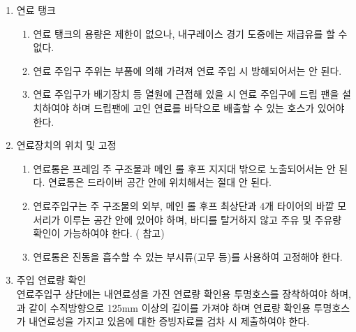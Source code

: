 \documentclass[final,a4paper,10pt]{report}
\begin{document}
\begin{enumerate}
  \item\label{rule:formula-technical.fuel-system.fuel-tank} 연료 탱크
    \begin{enumerate}
      \item\label{rule:formula-technical.fuel-system.fuel-tank.no-refuel-during-endurance} 연료 탱크의 용량은 제한이 없으나, 내구레이스 경기 도중에는 재급유를 할 수 없다.
      \item\label{rule:formula-technical.fuel-system.fuel-tank.unobstructed-filler-neck} 연료 주입구 주위는 부품에 의해 가려져 연료 주입 시 방해되어서는 안 된다.
      \item\label{rule:formula-technical.fuel-system.fuel-tank.heat-source-drip-pan} 연료 주입구가 배기장치 등 열원에 근접해 있을 시 연료 주입구에 드립 팬을 설치하여야 하며 드립팬에 고인 연료를 바닥으로 배출할 수 있는 호스가 있어야 한다.
    \end{enumerate}

  \item\label{rule:formula-technical.fuel-system.location-and-mounting} 연료장치의 위치 및 고정
    \begin{enumerate}
      \item\label{rule:formula-technical.fuel-system.location-and-mounting.within-structure-not-cockpit} 연료통은 프레임 주 구조물과 메인 롤 후프 지지대 밖으로 노출되어서는 안 된다. 연료통은 드라이버 공간 안에 위치해서는 절대 안 된다.
      \item\label{rule:formula-technical.fuel-system.location-and-mounting.filler-envelope-and-accessibility} 연료주입구는 주 구조물의 외부, 메인 롤 후프 최상단과 4개 타이어의 바깥 모서리가 이루는 공간 안에 있어야 하며, 바디를 탈거하지 않고 주유 및 주유량 확인이 가능하여야 한다. ( 참고)
      \item\label{rule:formula-technical.fuel-system.location-and-mounting.vibration-absorbing-mounts} 연료통은 진동을 흡수할 수 있는 부시류(고무 등)를 사용하여 고정해야 한다.
    \end{enumerate}

  \item\label{rule:formula-technical.fuel-system.fuel-level-sight-tube} 주입 연료량 확인\\
    연료주입구 상단에는 내연료성을 가진 연료량 확인용 투명호스를 장착하여야 하며, 과 같이 수직방향으로 125mm 이상의 길이를 가져야 하며 연료량 확인용 투명호스가 내연료성을 가지고 있음에 대한 증빙자료를 검차 시 제출하여야 한다.


\end{enumerate}
\end{document}
